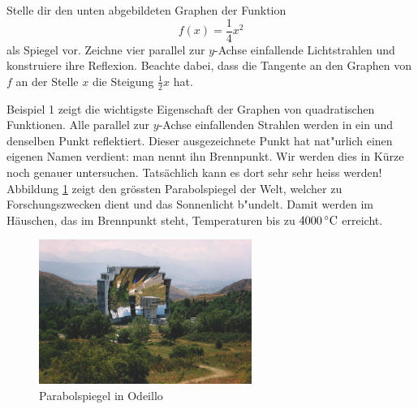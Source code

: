 \documentclass[%
11pt,%
twoside,%
titlepage,%
german,%
headsepline%
]{scrartcl}
\newcommand{\definition}[1]{\colorbox{emerald}{#1}}
\begin{document}
\begin{bsp}
Stelle dir den unten abgebildeten Graphen der Funktion
$$f(x) = \frac{1}{4}x^2$$
als Spiegel vor. Zeichne vier parallel zur $y$-Achse einfallende Lichtstrahlen und konstruiere ihre Reflexion. Beachte dabei, dass die Tangente an den Graphen von $f$ an der Stelle $x$ die Steigung $\frac{1}{2}x$ hat.
\begin{figure}
\begin{center}
\end{center}
\end{figure}
\end{bsp}
Beispiel 1 zeigt die wichtigste Eigenschaft der Graphen von quadratischen Funktionen. Alle parallel zur $y$-Achse einfallenden Strahlen werden in ein und denselben Punkt reflektiert. Dieser ausgezeichnete Punkt hat nat"urlich einen eigenen Namen verdient: man nennt ihn
\definition{Brennpunkt}. Wir werden dies in K\"urze noch genauer untersuchen.
Tats\"achlich kann es dort sehr sehr heiss werden! Abbildung \ref{odiello} zeigt den gr\"ossten Parabolspiegel der Welt, welcher zu Forschungszwecken dient und das Sonnenlicht \glqq b"undelt\grqq. Damit werden im H\"auschen, das im Brennpunkt steht, Temperaturen bis zu $\unit[4000]{ ^\circ C}$ erreicht.

\begin{figure}
\begin{center}
\includegraphics[width=0.618\textwidth]{pictures/odeillo}
\end{center}
\caption{Parabolspiegel in Odeillo}\label{odiello} 
\end{figure}
\end{document}
